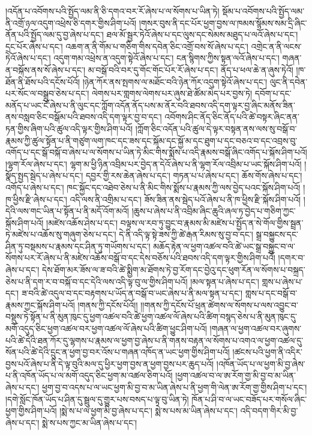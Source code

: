 །འདོན་པ་འབོགས་པའི་སྤྱོད་ལམ་ནི་ཅི་དགའ་བར་རོ་ཞེས་པ་ལ་སོགས་པ་ཡིན་ཏེ། སྡོམ་པ་འབོགས་པའི་སྤྱོད་ལམ་ནི་འགྲོ་ཉལ་འདུག་འཕྲེས་ཅི་དགར་གྱིས་ཤིག་པའོ། །གསར་བུས་ནི་དང་པོར་ཕྱག་བྱས་ལ་ཁམས་སྙོམས་སམ་དྲི་ཞིང་ནོན་པའི་སྤྱོད་ལམ་དུ་བྱ་ཞེས་པ་དང་། ཐལ་མོ་སྦྱར་ཏེའོ་ཞེས་པ་དང་ལུས་དང་སེམས་མཐུད་པ་ལའོ་ཞེས་པ་དང་། དྲང་པོར་ཞེས་པ་དང་། འཆག་ན་ནི་གོམ་པ་གཅིག་གིས་དབེན་ཅིང་འགྲོ་བས་སོ་ཞེས་པ་དང་། འགྲེང་ན་ནི་ལངས་ཏེའོ་ཞེས་པ་དང་། འདུག་གམ་འཕྲེས་ན་འདུག་སྟེའོ་ཞེས་པ་དང་། ངན་སྙིགས་ཀྱིས་སྟན་ལའོ་ཞེས་པ་དང་། གཞན་ན་བསྐོས་ནས་སོ་ཞེས་པ་དང་། མ་བསྒོ་བའི་བར་དུ་གོང་གོང་པོར་རོ་ཞེས་པ་དང་། ནོད་པ་ཕལ་ཆེ་ན་ཞུས་ཏེའོ། །ཁ་ཐོན་ནི་ཐོས་པའི་དངོས་པོའོ། །ཉེན་ཀོར་ནས་སྤགས་ལ་མཐོང་བའི་ཉེན་ཀོར་འདུག་སྟེའོ་ཞེས་པ་དང་། ལུང་ནི་དབེན་པར་སོང་ལ་བསྒྲུབ་ཅེས་པ་དང་། ལེགས་པར་གླགས་ལེགས་པར་ཞུས་ཐེ་ཚོམ་མེད་པར་བྱས་ཏེ། དབོག་པ་དང་མནོད་པ་ཡང་ངོ་ཞེས་པ་ནི་ལུང་དང་ཀློག་འདོན་ནོད་པས་མ་ནོར་བའི་ཐབས་འདི་དག་ལྟར་བྱ་ཞིང་མནོས་ཟིན་ནས་བསླབ་ཅིང་བསྒོམ་པའི་ཐབས་འདི་དག་ལྟར་བྱ་བ་དང་། འབོགས་ཤིང་ནོད་ཅིང་ནོད་པའི་ཚེ་བསྟར་ཞིང་ནན་ཏན་གྱིས་ཞིག་པའི་ཚུལ་འདི་ལྟར་གྱིས་ཤིག་པའོ། །ཀློག་ཅིང་འདོན་པའི་ཚུལ་དེ་ལྟར་བསྟན་ནས་ལས་སུ་བསྒོ་བ་རྣམས་ཀྱི་ཚུལ་སྟོན་པ་ནི་གཙུག་ལག་ཁང་དང་ཟས་དང་སྐོམ་དང་སྐྱོ་མ་དང་ཐུག་པ་དང་བཅའ་བ་དང་འབྲས་བུ་འགོད་པ་དང་སྒོ་བསྐོ་བ་ཞེས་པ་ལ་སོགས་པ་ཡིན་ཏེ་མིང་གིས་སྨོས་པ་འདི་རྣམས་བསྒོ་ཞིང་འགོད་པ་སྐོས་ཤིག་པའོ། །ལྷག་རོལ་ཞེས་པ་དང་། ལྷག་མ་ཕྱི་ཉིན་འབྲིམ་པར་བྱེད་ན་དེའོ་ཞེས་པ་ནི་ལྷག་རོལ་འབྲིམ་པ་ཡང་སྐོས་ཤིག་པའོ། །སྣོད་སྤྱད་སྦེད་པ་ཞེས་པ་དང་། དབྱར་གྱི་རས་ཆེན་ཞེས་པ་དང་། གཏན་པ་པ་ཞེས་པ་དང་། ཆོས་གོས་ཞེས་པ་དང་། འགོད་པ་ཞེས་པ་དང་། ཁང་སྐྱོང་དང་འཐེབ་ཅེས་པ་ནི་མིང་གིས་སྨོས་པ་རྣམས་ཀྱི་ལས་བྱེད་པའང་སྐོས་ཤིག་པའོ། །ཁ་ཕྱིས་རྫི་ཞེས་པ་དང་། འདི་ལས་ནི་འགྲིམ་པ་དང་། ཟོས་ཟིན་ནས་སྦེད་པའོ་ཞེས་པ་ནི་ཁ་ཕྱིས་རྫི་སྐོས་ཤིག་པའོ། །དེའི་ལས་གང་ཡིན་པ་སྟོན་པ་ནི་མདོ་འོག་མའོ། །ཆུས་པ་ཞེས་པ་ནི་འབྲིམ་ཞིང་ཆུའི་ཞལ་ཏ་བྱེད་པ་གཅིག་ཀྱང་སྐོས་ཤིག་པའོ། །མཛེས་འཆོས་ཤེས་པ་དང་། བལྟས་ལ་རབ་ཏུ་བྱུང་བ་རྣམས་མི་མཛེས་པ་སྤྱོད་ན་སེ་གོལ་གྱིས་སྦྲན་ཏེ་མཛེས་པ་འཆོས་སུ་གཞུག་ཅེས་པ་དང་། དེ་ནི་འདི་ལྟ་སྟེ་ཟས་ཀྱི་ཚེ་རྒན་རིམས་སུ་བྱ་བ་དང་། སྒྲ་བསྐྱུངས་དང་ཤིན་ཏུ་བསྡམས་པ་རྣམས་དང་ཤིན་ཏུ་གཡོགས་པ་དང་། མཆོད་རྟེན་ལ་ཕྱག་འཚལ་བའི་ཚེ་ཡང་སྒྲ་བསྐྱུང་བ་ལ་སོགས་པར་རོ་ཞེས་པ་ནི་མཛེས་འཆོས་བསྒོ་བ་དང་དེས་བཅོས་པའི་ཐབས་འདི་དག་ལྟར་གྱིས་ཤིག་པའོ། །དགར་བ་ཞེས་པ་དང་། དེས་ཐོག་མར་ཟོས་ལ་ཟ་བའི་ཚེ་སྨྱིག་མ་ཐོགས་ཏེ་བྱ་རོག་དང་བྱེའུ་དང་ཕུག་རོན་ལ་སོགས་པ་བསྐྲད་ཅེས་པ་ནི་དག་ར་བ་བསྐོ་བ་དང་དེའི་ལས་འདི་ལྟ་བུ་ལ་གྱིས་ཤིག་པའོ། །མལ་སྟན་པ་ཞེས་པ་དང་། གླས་པ་ཞེས་པ་དང་། ཟ་བའི་ཚེ་འདུལ་བ་དང་བརྟགས་པ་ཡོད་ན་བསྒོ་བ་ཡང་ཞེས་པ་ནི་མལ་སྟན་པ་དང་། གླས་པ་དང་བསྒོ་བ་རྣམས་ཀྱང་སྐོས་ཤིག་པའོ། །གནས་ཀྱི་དངོས་པོའོ།། །།གནས་ཀྱི་དངོས་པོ་ཕྲན་ཚེགས་ལ་སོགས་པ་ལས་འབྱུང་བ་བསྡུས་ཏེ་སྟོན་པ་ནི་མུན་ཁུང་དུ་ཕྱག་འཚལ་བའི་ཚེ་ཕྱག་འཚལ་ལོ་ཞེས་པའི་ཚིག་བསྙད་ཅེས་པ་ནི་མུན་ཁུང་དུ་མགོ་འདུད་ཅིང་ཕྱག་འཚལ་བར་ཕྱག་འཚལ་ལོ་ཞེས་པའི་ཚིག་ཕྱུང་ཤིག་པའོ། །གཞན་ལ་ཕྱག་འཚལ་བར་ཞུགས་པའི་ཚེ་དེའི་ཐན་ཀོར་དུ་ལྷགས་པ་རྣམས་ལ་ཕྱག་བྱ་ཞེས་པ་ནི་གནས་བརྟན་ལ་སོགས་པ་འགའ་ལ་ཕྱག་འཚལ་དུ་སོན་པའི་ཚེ་དེའི་དྲུང་ན་ཕྱག་བྱ་བར་འོས་པ་གཞན་འཁོད་ན་ཡང་ཕྱག་གྱིས་ཤིག་པའོ། །ཚངས་པའི་ཕྱག་ནི་འདིར་བྱས་པའོ་ཞེས་པ་ནི་དེ་ལྟ་བུའི་མལ་དུ་ཕྱིར་ཕྱག་བྱས་ན་ཕྱག་བྱས་པར་ཆུད་པའོ། །འཁོན་ཡོད་པ་ལ་ཕྱག་མི་བྱ་ཞེས་པ་ནི་འཁོན་ཡོད་པ་ལ་མགོ་འདུད་ཅིང་ཕྱག་མ་འཚལ་ཅིག་པའོ། །ཕྱག་འཚལ་བ་ལ་ཨ་རོག་གྱ་མི་བྱ་བ་མ་ཡིན་ཞེས་པ་དང་། ཕྱག་བྱ་བ་འདས་པ་ལ་ཡང་ཕྱག་མི་བྱ་བ་མ་ཡིན་ཞེས་པ་ནི་ཕྱག་གི་ལེན་ཨ་རོག་གྱ་གྱིས་ཤིག་པ་དང་། །དགེ་སློང་ཁོན་ཡོད་པ་ཤིན་དུ་སྦྲུལ་དུ་གྱུར་པས་བསད་པ་ལྟ་བུ་ཡིན་ཏེ། ཁོན་པ་ཤི་བ་ལ་ཡང་བཟོད་པར་གསོལ་ཞིང་ཕྱག་གྱིས་ཤིག་པའོ། །སྨེ་ས་པ་ལ་ཕྱག་མི་བྱ་ཞེས་པ་དང་། སྨེ་ས་པས་མ་ཡིན་ཞེས་པ་དང་། འདི་བདག་གིར་མི་བྱ་ཞེས་པ་དང་། སྨེ་ས་པས་ཀྱང་མ་ཡིན་ཞེས་པ་དང་། 